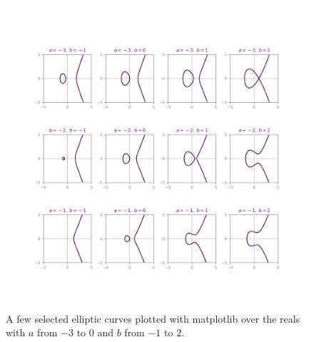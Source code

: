 \documentclass[11pt, a4paper]{report}
\begin{document}
\begin{figure}[h]
\begin{center}
\includegraphics[width=\linewidth]{elliptic_curves.png} 
\caption{A few selected elliptic curves plotted with matplotlib over the reals with $a$ from $-3$ to $0$ and $b$ from  $-1$ to $2$.}
\label{fig:realECs}
\end{center}
\end{figure}
\end{document}
